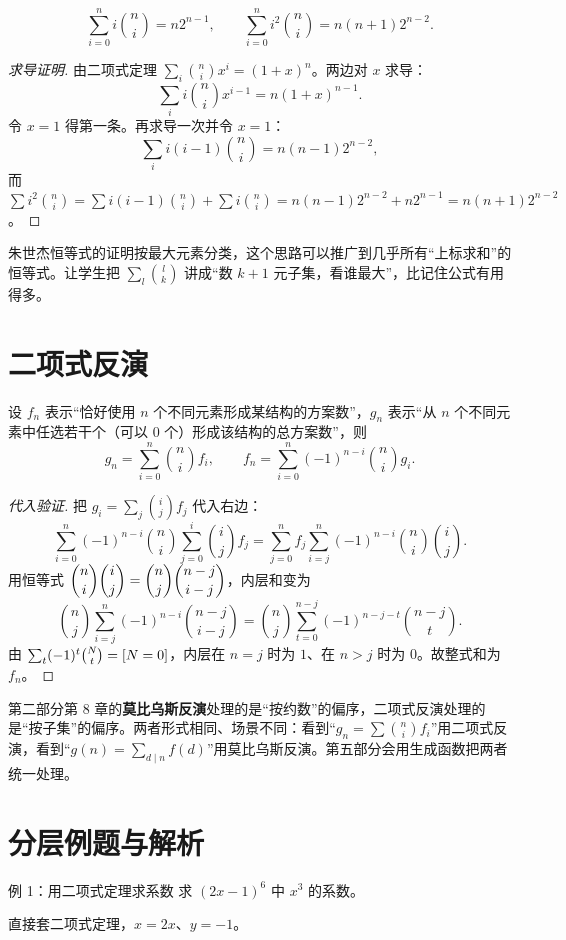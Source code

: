 \begin{theorem}[带权和的两条恒等式]
\[
\sum_{i=0}^{n}i\binom ni=n2^{n-1},\qquad
\sum_{i=0}^{n}i^2\binom ni=n(n+1)2^{n-2}.
\]
\end{theorem}
\begin{proof}[求导证明]
由二项式定理 $\sum_i\binom nix^i=(1+x)^n$。两边对 $x$ 求导：
\[
\sum_i i\binom nix^{i-1}=n(1+x)^{n-1}.
\]
令 $x=1$ 得第一条。再求导一次并令 $x=1$：
\[
\sum_i i(i-1)\binom ni=n(n-1)2^{n-2},
\]
而 $\sum i^2\binom ni=\sum i(i-1)\binom ni+\sum i\binom ni=n(n-1)2^{n-2}+n2^{n-1}=n(n+1)2^{n-2}$。
\end{proof}

\begin{teach}
朱世杰恒等式的证明按最大元素分类，这个思路可以推广到几乎所有“上标求和”的恒等式。让学生把 $\sum_{l}\binom lk$ 讲成“数 $k+1$ 元子集，看谁最大”，比记住公式有用得多。
\end{teach}

\section{二项式反演}
\begin{theorem}[二项式反演]
设 $f_n$ 表示“恰好使用 $n$ 个不同元素形成某结构的方案数”，$g_n$ 表示“从 $n$ 个不同元素中任选若干个（可以 $0$ 个）形成该结构的总方案数”，则
\[
g_n=\sum_{i=0}^{n}\binom nif_i,
\qquad
f_n=\sum_{i=0}^{n}(-1)^{n-i}\binom nig_i.
\]
\end{theorem}
\begin{proof}[代入验证]
把 $g_i=\sum_{j}\binom ijf_j$ 代入右边：
\[
\sum_{i=0}^{n}(-1)^{n-i}\binom ni\sum_{j=0}^{i}\binom ijf_j
=\sum_{j=0}^{n}f_j\sum_{i=j}^{n}(-1)^{n-i}\binom ni\binom ij.
\]
用恒等式 $\dbinom ni\dbinom ij=\dbinom nj\dbinom{n-j}{i-j}$，内层和变为
\[
\binom nj\sum_{i=j}^{n}(-1)^{n-i}\binom{n-j}{i-j}
=\binom nj\sum_{t=0}^{n-j}(-1)^{n-j-t}\binom{n-j}{t}.
\]
由 $\sum_t(-1)^t\binom{N}{t}=\left[N=0\right]$，内层在 $n=j$ 时为 $1$、在 $n>j$ 时为 $0$。故整式和为 $f_n$。
\end{proof}

\begin{tip}[二项式反演与莫比乌斯反演的关系]
第二部分第 8 章的\textbf{莫比乌斯反演}处理的是“按约数”的偏序，二项式反演处理的是“按子集”的偏序。两者形式相同、场景不同：看到“$g_n=\sum\binom nif_i$”用二项式反演，看到“$g(n)=\sum_{d\mid n}f(d)$”用莫比乌斯反演。第五部分会用生成函数把两者统一处理。
\end{tip}

\section{分层例题与解析}
\begin{problem}{例 1：用二项式定理求系数}
求 $(2x-1)^6$ 中 $x^3$ 的系数。
\end{problem}
\hint 直接套二项式定理，$x=2x$、$y=-1$。

